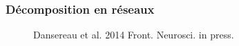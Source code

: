 \documentclass{beamer}
\begin{document}
\begin{frame}
\frametitle{Décomposition en réseaux}
\begin{figure}
\begin{center}
\end{center}
\tiny{Dansereau et al. 2014 Front. Neurosci. in press.}
\end{figure}
\end{frame}

\end{document}
